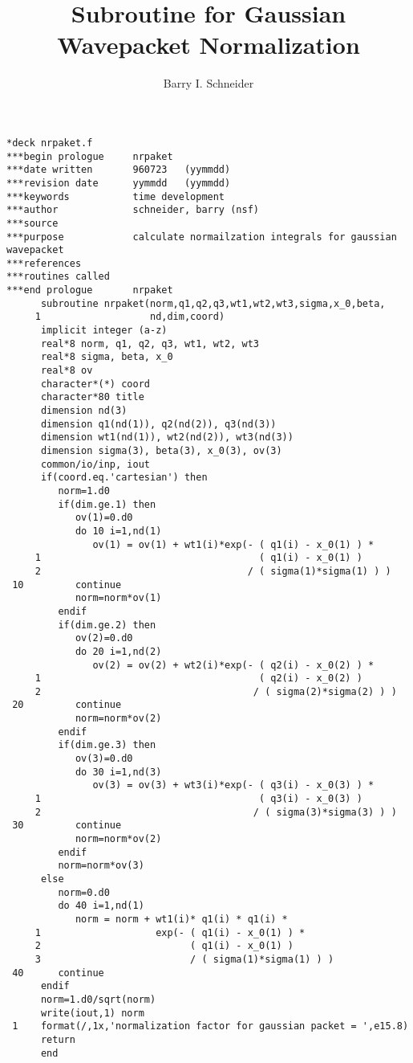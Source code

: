 \documentclass{article}
\title{Subroutine for Gaussian Wavepacket Normalization}
\author{Barry I. Schneider}
\date{}
\begin{document}
 \maketitle
\begin{verbatim}
*deck nrpaket.f
***begin prologue     nrpaket
***date written       960723   (yymmdd)
***revision date      yymmdd   (yymmdd)
***keywords           time development
***author             schneider, barry (nsf)
***source             
***purpose            calculate normailzation integrals for gaussian wavepacket 
***references         
***routines called    
***end prologue       nrpaket
      subroutine nrpaket(norm,q1,q2,q3,wt1,wt2,wt3,sigma,x_0,beta,
     1                   nd,dim,coord)
      implicit integer (a-z)
      real*8 norm, q1, q2, q3, wt1, wt2, wt3
      real*8 sigma, beta, x_0
      real*8 ov
      character*(*) coord
      character*80 title
      dimension nd(3)
      dimension q1(nd(1)), q2(nd(2)), q3(nd(3))
      dimension wt1(nd(1)), wt2(nd(2)), wt3(nd(3))
      dimension sigma(3), beta(3), x_0(3), ov(3)
      common/io/inp, iout
      if(coord.eq.'cartesian') then
         norm=1.d0
         if(dim.ge.1) then
            ov(1)=0.d0
            do 10 i=1,nd(1)
               ov(1) = ov(1) + wt1(i)*exp(- ( q1(i) - x_0(1) ) *
     1                                      ( q1(i) - x_0(1) )
     2                                    / ( sigma(1)*sigma(1) ) )
 10         continue   
            norm=norm*ov(1)
         endif
         if(dim.ge.2) then
            ov(2)=0.d0
            do 20 i=1,nd(2)
               ov(2) = ov(2) + wt2(i)*exp(- ( q2(i) - x_0(2) ) *
     1                                      ( q2(i) - x_0(2) )
     2                                     / ( sigma(2)*sigma(2) ) )
 20         continue   
            norm=norm*ov(2)
         endif
         if(dim.ge.3) then
            ov(3)=0.d0
            do 30 i=1,nd(3)
               ov(3) = ov(3) + wt3(i)*exp(- ( q3(i) - x_0(3) ) *
     1                                      ( q3(i) - x_0(3) )
     2                                     / ( sigma(3)*sigma(3) ) )
 30         continue   
            norm=norm*ov(2)
         endif
         norm=norm*ov(3)            
      else
         norm=0.d0
         do 40 i=1,nd(1)
            norm = norm + wt1(i)* q1(i) * q1(i) * 
     1                    exp(- ( q1(i) - x_0(1) ) *
     2                          ( q1(i) - x_0(1) )
     3                          / ( sigma(1)*sigma(1) ) )
 40      continue   
      endif
      norm=1.d0/sqrt(norm)
      write(iout,1) norm
 1    format(/,1x,'normalization factor for gaussian packet = ',e15.8)
      return
      end       
\end{verbatim}
\end{document}

